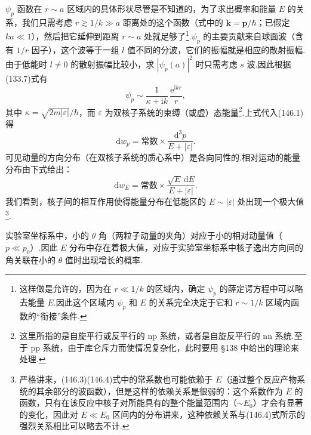 $\psi_p$ 函数在 $r\sim a$ 区域内的具体形状尽管是不知道的，为了求出概率和能量 $E$ 的关系，我们只需考虑 $r\gtrsim1/k\gg a$ 距离处的这个函数（式中的 $\boldsymbol{k}=\boldsymbol{p}/\hbar$；已假定 $ka\ll1$），然后把它延伸到距离 $r\sim a$ 处就足够了\footnote{这样做是允许的，因为在 $r\ll1/k$ 的区域内，确定 $\psi_p$ 的薛定谔方程中可以略去能量 $E$.因此这个区域内 $\psi_p$ 和 $E$ 的关系完全决定于它和 $r\sim1/k$ 区域内函数的“衔接”条件.}.$\psi_p$ 的主要贡献来自球面波（含有 $1/r$ 因子），这个波等于一组 $l$ 值不同的分波，它们的振幅就是相应的散射振幅.由于低能时 $l\neq0$ 的散射振幅比较小，求 $|\psi_p(a)|^2$ 时只需考虑 $s$ 波.因此根据(133.7)式有
\begin{equation}
  \psi_p\sim\frac{1}{\kappa+\mathrm{i}k}\,\frac{\mathrm{e}^{\mathrm{i}kr}}{r},
\end{equation}
其中 $\kappa=\sqrt{2m|\varepsilon|}/\hbar$，而 $\varepsilon$ 为双核子系统的束缚（或虚）态能量\footnote{这里所指的是自旋平行或反平行的 np 系统，或者是自旋反平行的 nn 系统.至于 pp 系统，由于库仑斥力而使情况复杂化，此时要用 §138 中给出的理论来处理.}.上式代入(146.1)得
\begin{equation}
  \mathrm{d}w_p=\text{常数}\times\frac{\mathrm{d}^3p}{E+|\varepsilon|}.
\end{equation}
可见动量的方向分布（在双核子系统的质心系中）是各向同性的.相对运动的能量分布由下式给出：
\begin{equation}
  \mathrm{d}w_E=\text{常数}\times\frac{\sqrt{E}\,\mathrm{d}E}{E+|\varepsilon|}.
\end{equation}
我们看到，核子间的相互作用使得能量分布在低能区的 $E\sim|\varepsilon|$ 处出现一个极大值\footnote{严格讲来，(146.3)(146.4)式中的常系数也可能依赖于 $E$（通过整个反应产物系统的其余部分的波函数），但是这样的依赖关系是很弱的：这个系数作为 $E$ 的函数，只有在该反应中核子对所能具有的整个能量范围内（$\sim E_0$）才会有显著的变化，因此对 $E\ll E_0$ 区间内的分布讲来，这种依赖关系与(146.4)式所示的强烈关系相比可以略去不计.}.

实验室坐标系中，小的 $\theta$ 角（两粒子动量的夹角）对应于小的相对动量值（$p\ll p_0$）.因此 $E$ 分布中存在着极大值，对应于实验室坐标系中核子逸出方向间的角关联在小的 $\theta$ 值时出现增长的概率.

